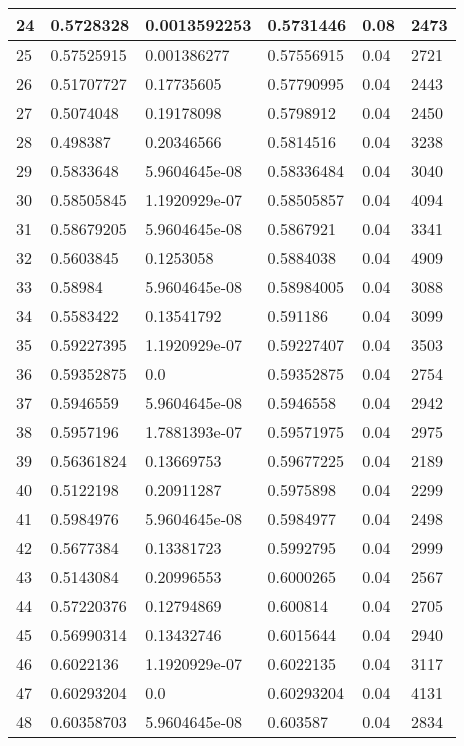 \begin{longtable}{|l|l|l|l|l|l|}
24 & 0.5728328 & 0.0013592253 & 0.5731446 & 0.08 & 2473 \\ \hline 
25 & 0.57525915 & 0.001386277 & 0.57556915 & 0.04 & 2721 \\ \hline 
26 & 0.51707727 & 0.17735605 & 0.57790995 & 0.04 & 2443 \\ \hline 
27 & 0.5074048 & 0.19178098 & 0.5798912 & 0.04 & 2450 \\ \hline 
28 & 0.498387 & 0.20346566 & 0.5814516 & 0.04 & 3238 \\ \hline 
29 & 0.5833648 & 5.9604645e-08 & 0.58336484 & 0.04 & 3040 \\ \hline 
30 & 0.58505845 & 1.1920929e-07 & 0.58505857 & 0.04 & 4094 \\ \hline 
31 & 0.58679205 & 5.9604645e-08 & 0.5867921 & 0.04 & 3341 \\ \hline 
32 & 0.5603845 & 0.1253058 & 0.5884038 & 0.04 & 4909 \\ \hline 
33 & 0.58984 & 5.9604645e-08 & 0.58984005 & 0.04 & 3088 \\ \hline 
34 & 0.5583422 & 0.13541792 & 0.591186 & 0.04 & 3099 \\ \hline 
35 & 0.59227395 & 1.1920929e-07 & 0.59227407 & 0.04 & 3503 \\ \hline 
36 & 0.59352875 & 0.0 & 0.59352875 & 0.04 & 2754 \\ \hline 
37 & 0.5946559 & 5.9604645e-08 & 0.5946558 & 0.04 & 2942 \\ \hline 
38 & 0.5957196 & 1.7881393e-07 & 0.59571975 & 0.04 & 2975 \\ \hline 
39 & 0.56361824 & 0.13669753 & 0.59677225 & 0.04 & 2189 \\ \hline 
40 & 0.5122198 & 0.20911287 & 0.5975898 & 0.04 & 2299 \\ \hline 
41 & 0.5984976 & 5.9604645e-08 & 0.5984977 & 0.04 & 2498 \\ \hline 
42 & 0.5677384 & 0.13381723 & 0.5992795 & 0.04 & 2999 \\ \hline 
43 & 0.5143084 & 0.20996553 & 0.6000265 & 0.04 & 2567 \\ \hline 
44 & 0.57220376 & 0.12794869 & 0.600814 & 0.04 & 2705 \\ \hline 
45 & 0.56990314 & 0.13432746 & 0.6015644 & 0.04 & 2940 \\ \hline 
46 & 0.6022136 & 1.1920929e-07 & 0.6022135 & 0.04 & 3117 \\ \hline 
47 & 0.60293204 & 0.0 & 0.60293204 & 0.04 & 4131 \\ \hline 
48 & 0.60358703 & 5.9604645e-08 & 0.603587 & 0.04 & 2834 \\ \hline 

\end{longtable}
